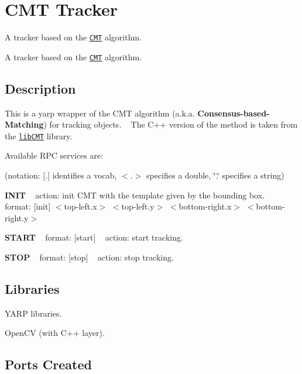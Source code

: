 \section{C\+M\+T Tracker}
\label{group__icub__cmt}


A tracker based on the \href{http://www.gnebehay.com/cmt}{\tt C\+M\+T} algorithm.  


A tracker based on the \href{http://www.gnebehay.com/cmt}{\tt C\+M\+T} algorithm. 

\hypertarget{group__icub__tld_intro_sec}{}\subsection{Description}\label{group__icub__tld_intro_sec}
This is a yarp wrapper of the C\+M\+T algorithm (a.\+k.\+a. {\bfseries Consensus-\/based-\/\+Matching}) for tracking objects. ~\newline
The C++ version of the method is taken from the \href{https://github.com/delmottea/libCMT}{\tt lib\+C\+M\+T} library.

Available R\+P\+C services are\+:

(notation\+: \mbox{[}.\mbox{]} identifies a vocab, $<$.$>$ specifies a double, \char`\"{}.\char`\"{} specifies a string)

{\bfseries I\+N\+I\+T} ~\newline
action\+: init C\+M\+T with the template given by the bounding box. ~\newline
format\+: \mbox{[}init\mbox{]} $<$top-\/left.\+x$>$ $<$top-\/left.\+y$>$ $<$bottom-\/right.\+x$>$ $<$bottom-\/right.\+y$>$ ~\newline


{\bfseries S\+T\+A\+R\+T} ~\newline
format\+: \mbox{[}start\mbox{]} ~\newline
 action\+: start tracking.

{\bfseries S\+T\+O\+P} ~\newline
format\+: \mbox{[}stop\mbox{]} ~\newline
 action\+: stop tracking.\hypertarget{group__icub__tld_lib_sec}{}\subsection{Libraries}\label{group__icub__tld_lib_sec}

\begin{DoxyItemize}
\item Y\+A\+R\+P libraries.
\item Open\+C\+V (with C++ layer).
\end{DoxyItemize}\hypertarget{group__icub__tld_portsc_sec}{}\subsection{Ports Created}\label{group__icub__tld_portsc_sec}

